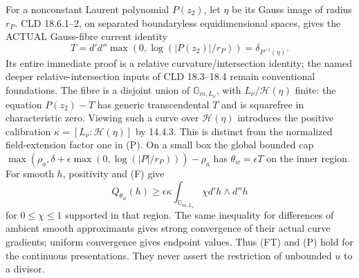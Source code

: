 \documentclass[11pt]{article}
\newcommand{\DD}{d'd''}
\newcommand{\HH}{\mathscr H}
\theoremstyle{remark}\newtheorem{remark}[theorem]{Remark}
\begin{document}
For a nonconstant Laurent polynomial $P(z_2)$, let $\eta$ be its
Gauss image of radius $r_P$. CLD 18.6.1--2, on separated boundaryless
equidimensional spaces, gives the ACTUAL Gauss-fibre current identity
\[
T=\DD\max(0,\log(|P(z_2)|/r_P))=\delta_{P^{-1}(\eta)}.
\tag{F}
\]
Its entire immediate proof is a relative curvature/intersection identity;
the named deeper relative-intersection inputs of CLD 18.3--18.4 remain
conventional foundations. The fibre is a disjoint union of
$\mathbb G_{m,L_\nu}$, with $L_\nu/\HH(\eta)$ finite: the equation
$P(z_2)-T$ has generic transcendental $T$ and is squarefree in
characteristic zero. Viewing such a curve over $\HH(\eta)$ introduces
the positive calibration $\kappa=[L_\nu:\HH(\eta)]$ by 14.4.3.
This is distinct from the normalized field-extension factor one in (P).
On a small box the global bounded cap
$\max(\rho_a,\delta+\epsilon\max(0,\log(|P|/r_P)))-\rho_a$
has $\theta_w=\epsilon T$ on the inner region. For smooth $h$,
positivity and (F) give
\[
Q_{\theta_w}(h)\ge\epsilon\kappa
\int_{\mathbb G_{m,L_\nu}}\chi d'h\wedge d''h
\tag{FT}
\]
for $0\le\chi\le1$ supported in that region. The same inequality
for differences of ambient smooth approximants gives strong convergence
of their actual curve gradients; uniform convergence gives endpoint
values. Thus (FT) and (P) hold for the continuous presentations. They
never assert the restriction of unbounded $u$ to a divisor.
\end{document}
